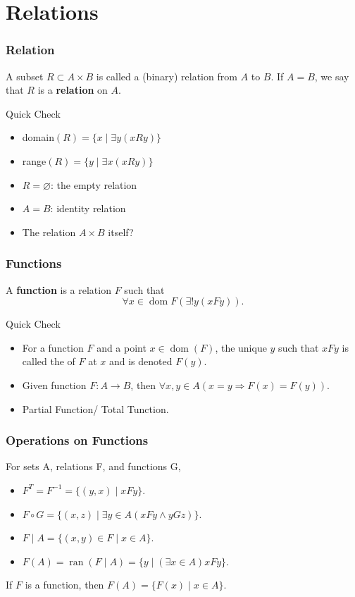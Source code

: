 \documentclass{beamer}
\begin{document}
\section{Relations}
\begin{frame}
    \frametitle{Relation}
    \hh A subset $R \subset A \times B$ is called a (binary) relation from $A$ to $B$. 
    If $A = B$,	we say that $R$ is a \textbf{\textcolor[rgb]{0,0.6,0.2}{relation}} on $A$.\\ 
    \vv
    \begin{block}{Quick Check}
        \begin{itemize}
            \item domain$(R)=\{x \mid \exists y(x R y)\}$
            \item range$(R)=\{y \mid \exists x(x R y)\}$
            \item $R = \varnothing $: the empty relation
            \item $A = B$: identity relation
            \item The relation $A \times B$ itself? 
        \end{itemize}
    \end{block}

\end{frame}
\begin{frame}
    \frametitle{Functions}
    \hh A \textbf{\textcolor[rgb]{0,0.6,0.2}{function}} is a relation $F$ such that $$\forall x \in \operatorname{dom} F(\exists ! y(x F y)).$$
    
    \begin{block}{Quick Check}
        \begin{itemize}
            \item  For a function $F$ and a point $x \in \operatorname{dom} (F)$, the unique $y$ such that $xFy$ is called the  of $F$ at $x$ and is denoted $F(y)$. 
            \item Given function $F : A \to B$, then $\forall x, y \in A(x = y \Rightarrow F(x) = F(y))$.
            \item Partial Function/ Total Tunction.
        \end{itemize}
    \end{block}

\end{frame}
\begin{frame}
    \frametitle{Operations on Functions}
    \par For  sets A, relations F, and functions G,
	\vv
    \begin{itemize}
		\item {} $F^T = F^{-1} = \{(y, x) \mid xFy\}$.
        \item {} $F \circ G = \{(x, z) \mid \exists y \in A(xFy \wedge yGz)\}$.
		\item {} $F \mid A = \{(x, y) \in F \mid x \in A \}$.
		\item {} $F(A) = \operatorname{ran}(F \mid A) = \{y \mid (\exists x \in A) xFy \}$. 
	\end{itemize}
    \vv
    If $F$ is a function, then $F(A) = \{F(x) \mid x \in A\}$.
\end{frame}
\end{document}
